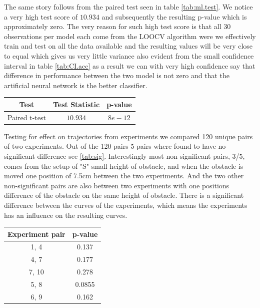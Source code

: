 \documentclass{article}
\begin{document}
\noindent The same story follows from the paired test seen in table \ref{tab:ml.test}. We notice a very high test score of $10.934$ and subsequently the resulting p-value which is approximately zero. The very reason for such high test score is that all 30 observations per model each come from the LOOCV algorithm were we effectively train and test on all the data available and the resulting values will be very close to equal which gives us very little variance also evident from the small confidence interval in table \ref{tab:CI.acc} as a result we can with very high confidence say that difference in performance between the two model is not zero and that the artificial neural network is the better classifier.\bigskip

\begin{minipage}{\linewidth}
	\centering
	\begin{tabular}{ c c c}\toprule[1.5pt]
	\bf Test  & \bf Test Statistic & \bf p-value \\\midrule[1.5pt]
	Paired t-test  & $10.934$ &  $8e-12$ \\
	\bottomrule[1.5pt]
	\end {tabular}\par
	\label{tab:ml.test}
\end{minipage} \bigskip

\noindent Testing for effect on trajectories from experiments we compared 120 unique pairs of two experiments. Out of the 120 pairs 5 pairs where found to have no significant difference see \ref{tab:sig}. Interestingly most non-significant pairs, 3/5, comes from the setup of "S" small height of obstacle, and when the obstacle is moved one position of 7.5cm between the two experiments. And the two other non-significant pairs are also between two experiments with one positions difference of the obstacle on the same height of obstacle. There is a significant difference between the curves of the experiments, which means the experiments has an influence on the resulting curves.\bigskip

\begin{minipage}{\linewidth}
\centering
{}
\begin{tabular}{cc}\toprule[1.5pt]
\textbf{Experiment pair} & \textbf{p-value} \\\midrule[1.25pt]
1, 4         	& 0.137            \\\midrule
4, 7  		& 0.177            \\\midrule
7, 10           	& 0.278            \\\midrule
5, 8        	& 0.0855           \\\midrule
6, 9      	& 0.162           \\\bottomrule[1.25pt]
\end{tabular}
\label{tab:sig}
\end{minipage}
\end{document}
